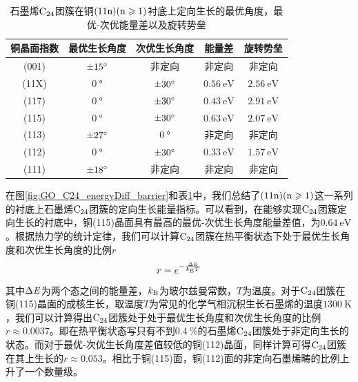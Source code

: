 \begin{table}[htb]
    \caption{石墨烯$\rm{C_{24}}$团簇在铜$\rm{(11n)(n \geqslant 1)}$衬底上定向生长的最优角度，最优-次优能量差以及旋转势垒}
    \centering
    \begin{tabular}{ccccc}
        \toprule
        铜晶面指数 & 最优生长角度            & 次优生长角度           & 能量差  & 旋转势垒 \\
        \midrule
        (001)      & $\SI{\pm 15 }{\degree}$ & 非定向                 & 非定向                      & 非定向                       \\
        (11X)      & $\SI{0}{\degree}$       & $\SI{\pm 30}{\degree}$ & $\SI{0.56 }{\electronvolt}$ & $\SI{2.56 }{\electronvolt}$  \\
        (117)      & $\SI{0}{\degree}$       & $\SI{\pm 30}{\degree}$ & $\SI{0.43 }{\electronvolt}$ & $\SI{2.91 }{\electronvolt}$  \\
        (115)      & $\SI{0}{\degree}$       & $\SI{\pm 30}{\degree}$ & $\SI{0.63 }{\electronvolt}$ & $\SI{2.07}{\electronvolt}$  \\
        (113)      & $\SI{\pm 27}{\degree}$  & $\SI{0}{\degree}$      & 非定向                      & 非定向                       \\
        (112)      & $\SI{0}{\degree}$       & $\SI{\pm 30}{\degree}$ & $\SI{0.33 }{\electronvolt}$ & $\SI{1.57 }{\electronvolt}$  \\
        (111)      & $\SI{\pm 18 }{\degree}$ & 非定向                 & 非定向                      & 非定向                       \\
        \bottomrule
    \end{tabular}
    \label{tab:GO_energyDiff_barrier}
\end{table}

在图\ref{fig:GO_C24_energyDiff_barrier}和表\ref{tab:GO_energyDiff_barrier}中，我们总结了$\rm{(11n)(n \geqslant 1)}$这一系列的衬底上石墨烯$\rm{C_{24}}$团簇的定向生长能量指标。可以看到，在能够实现$\rm{C_{24}}$团簇定向生长的衬底中，铜(115)晶面具有最高的最优-次优生长角度能量差值，为$\SI{0.64 }{\electronvolt}$。根据热力学的统计定律，我们可以计算$\rm{C_{24}}$团簇在热平衡状态下处于最优生长角度和次优生长角度的比例$r$\chinesecolon
\begin{equation}
    r=e^{-\frac{\rm{\Delta} \it E}{k_{\rm B}T}}
\end{equation}
其中$\rm{\Delta} \it E$为两个态之间的能量差，$k_{\rm B}$为玻尔兹曼常数，$T$为温度。对于$\rm{C_{24}}$团簇在铜(115)晶面的成核生长，取温度$T$为常见的化学气相沉积生长石墨烯的温度$\SI{1300 }{\kelvin}$，我们可以计算得出$\rm{C_{24}}$团簇处于处于最优生长角度和次优生长角度的比例$r\approx 0.0037$。即在热平衡状态写只有不到$\SI{0.4}{\percent}$的石墨烯$\rm{C_{24}}$团簇处于非定向生长的状态。而对于最优-次优生长角度差值较低的铜(112)晶面，同样计算可得$\rm{C_{24}}$团簇在其上生长的$r\approx 0.053$。相比于铜(115)面，铜(112)面的非定向石墨烯畴的比例上升了一个数量级。

